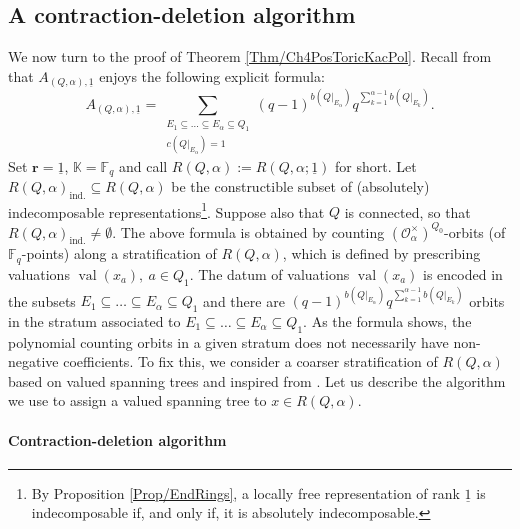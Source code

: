 \documentclass[11pt,english]{article}
\numberwithin{equation}{section}
\numberwithin{figure}{section}
\theoremstyle{definition}
\theoremstyle{plain}
\theoremstyle{remark}
\DeclareMathOperator{\val}{val}
\newcommand\rr{\mathbf{r}}
\newcommand\FF{\mathbb{F}}
\newcommand\KK{\mathbb{K}}
\begin{document}
\subsection{A contraction-deletion algorithm \label{Subsect/Algo}}

We now turn to the proof of Theorem \ref{Thm/Ch4PosToricKacPol}.
Recall from \cite[Prop. 4.34.]{Wys17b} that $A_{(Q,\alpha),\underline{1}}$
enjoys the following explicit formula:\[
A_{(Q,\alpha),\underline{1}}=
\sum_{\substack{E_1\subseteq\ldots\subseteq E_{\alpha}\subseteq Q_1 \\ c(Q\vert_{E_{\alpha}})=1}}
(q-1)^{b(Q\vert_{E_{\alpha}})}q^{\sum_{k=1}^{\alpha-1}b(Q\vert_{E_{k}})}.
\] Set $\rr=\underline{1}$, $\KK=\FF_{q}$ and call $R(Q,\alpha):=R(Q,\alpha;\underline{1})$
for short. Let $R(Q,\alpha)_{\mathrm{ind.}}\subseteq R(Q,\alpha)$
be the constructible subset of (absolutely) indecomposable representations\footnote{By Proposition \ref{Prop/EndRings}, a locally free representation
of rank $\underline{1}$ is indecomposable if, and only if, it is
absolutely indecomposable.}. Suppose also that $Q$ is connected, so that $R(Q,\alpha)_{\mathrm{ind.}}\ne\emptyset$.
The above formula is obtained by counting $\left(\mathcal{O}_{\alpha}^{\times}\right)^{Q_{0}}$-orbits
(of $\FF_{q}$-points) along a stratification of $R(Q,\alpha)$, which
is defined by prescribing valuations $\val(x_{a}),\ a\in Q_{1}$.
The datum of valuations $\val(x_{a})$ is encoded in the subsets $E_{1}\subseteq\ldots\subseteq E_{\alpha}\subseteq Q_{1}$
and there are $(q-1)^{b(Q\vert_{E_{\alpha}})}q^{\sum_{k=1}^{\alpha-1}b(Q\vert_{E_{k}})}$
orbits in the stratum associated to $E_{1}\subseteq\ldots\subseteq E_{\alpha}\subseteq Q_{1}$.
As the formula shows, the polynomial counting orbits in a given stratum
does not necessarily have non-negative coefficients. To fix this,
we consider a coarser stratification of $R(Q,\alpha)$ based on valued
spanning trees and inspired from \cite{AMRV22}. Let us describe the
algorithm we use to assign a valued spanning tree to $x\in R(Q,\alpha)$.

\paragraph*{Contraction-deletion algorithm}
\end{document}

